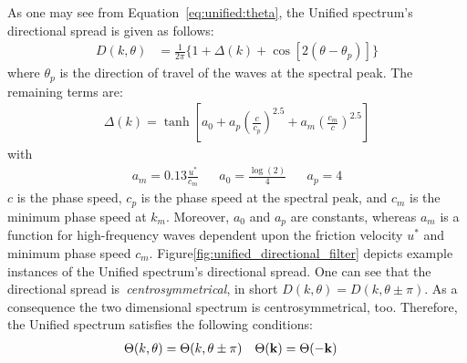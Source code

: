 As one may see from Equation~\ref{eq:unified:theta}, the Unified spectrum's
directional spread is given as follows:
%
\begin{align}
D(k, \theta) &= \frac{1}{2\pi}\{1 + \Delta(k) + \cos[2(\theta - 
\theta_p)]\}
\end{align}
where $\theta_p$ is the direction of travel of the waves at the spectral peak.
The remaining terms are:
\begin{align*}
\Delta(k) = \tanh\left[a_0 + a_p\left(\frac{c}{c_p}\right)^{2.5} + 
a_m\left(\frac{c_m}{c}\right)^{2.5}\right]
\end{align*}
with
\begin{align*}
a_m = 0.13 \frac{u^{\ast}}{c_m} && a_0 = \frac{\log(2)}{4} && a_p = 4
\end{align*}
$c$ is the phase speed, $c_p$ is the phase speed at the spectral peak, and $c_m$
is the minimum phase speed at $k_m$. Moreover, $a_0$ and $a_p$ are constants,
whereas $a_m$ is a function for high-frequency waves dependent upon the friction
velocity $u^\ast$ and minimum phase speed $c_m$.
Figure\ref{fig:unified_directional_filter} depicts example
instances of the Unified spectrum's directional spread. One can see that the
directional spread is~\emph{centrosymmetrical}, in short
$D(k, \theta) = D(k, \theta \pm \pi)$. As a consequence the two dimensional
\wavenumber spectrum is centrosymmetrical, too. Therefore, the Unified spectrum
satisfies the following conditions:
\begin{align*}
\Theta(k, \theta) &= \Theta(k, \theta \pm \pi) & \Theta(\mathbf{k}) &= \Theta(-\mathbf{k})
\end{align*}
%
